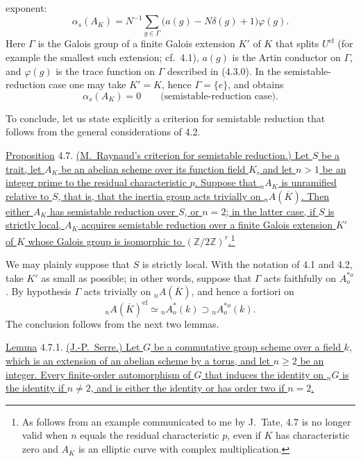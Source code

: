 exponent:
\begin{equation}\tag{4.6.2}
 \alpha_s(A_K)
 =N^{-1}\sum_{g\in\Gamma}
   \bigl(a(g)-N\delta(g)+1\bigr)\varphi(g).
\end{equation}
Here $\Gamma$ is the Galois group of a finite Galois extension $K'$ of
$K$ that splits $U^{\mathrm{ef}}$ (for example the smallest such
extension; cf.\ 4.1), $a(g)$ is the Artin conductor on $\Gamma$, and
$\varphi(g)$ is the trace function on $\Gamma$ described in (4.3.0).
In the semistable-reduction case one may take $K'=K$, hence
$\Gamma=\{e\}$, and obtains
\begin{equation}\tag{4.6.3}
 \alpha_s(A_K)=0
 \qquad\text{(semistable-reduction case).}
\end{equation}

To conclude, let us state explicitly a criterion for semistable
reduction that follows from the general considerations of 4.2.

\medskip
\noindent
\underline{Proposition} 4.7. \underline{(M.\ Raynaud's criterion for
semistable reduction.)  Let $S$ be a trait, let $A_K$ be an abelian
scheme over its function field $K$, and let $n>1$ be an integer prime
to the residual characteristic $p$.  Suppose that ${}_nA_K$ is
unramified relative to $S$, that is, that the inertia group acts
trivially on ${}_nA(\overline K)$.  Then either $A_K$ has semistable
reduction over $S$, or $n=2$; in the latter case, if $S$ is strictly
local, $A_K$ acquires semistable reduction over a finite Galois extension
$K'$ of $K$ whose Galois group is isomorphic to
$(\mathbb Z/2\mathbb Z)^r$.}\footnote{As follows from an example
communicated to me by J.\ Tate, 4.7 is no longer valid when $n$ equals
the residual characteristic $p$, even if $K$ has characteristic zero
and $A_K$ is an elliptic curve with complex multiplication.}

We may plainly suppose that $S$ is strictly local.  With the notation
of 4.1 and 4.2, take $K'$ as small as possible; in other words, suppose
that $\Gamma$ acts faithfully on $A^{*o}_o$.  By hypothesis $\Gamma$
acts trivially on ${}_nA(\overline K)$, and hence a fortiori on
\[
 {}_nA(\overline K)^{\mathrm{ef}}
 \simeq{}_nA^*_o(k)\supset{}_nA^{*o}_o(k).
\]
The conclusion follows from the next two lemmas.

\medskip
\noindent
\underline{Lemma} 4.7.1. \underline{(J.-P.\ Serre.)  Let $G$ be a
commutative group scheme over a field $k$, which is an extension of an
abelian scheme by a torus, and let $n\geq2$ be an integer.  Every
finite-order automorphism of $G$ that induces the identity on ${}_nG$ is
the identity if $n\neq2$, and is either the identity or has order two if
$n=2$.}

